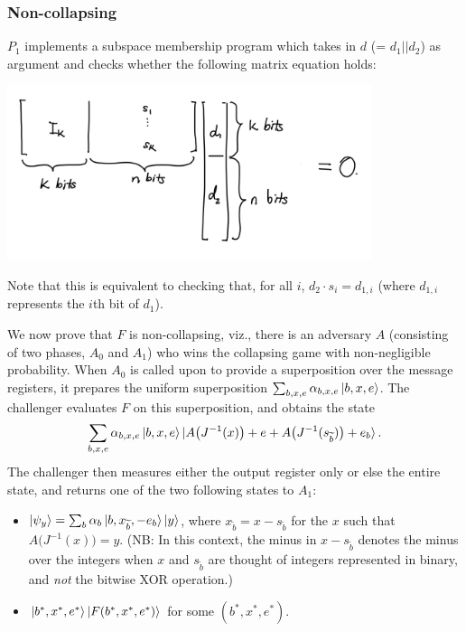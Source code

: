 \documentclass{article}
\begin{document}
\subsubsection{Non-collapsing}
$P_1$ implements a subspace membership program which takes in $d$ (= $d_1 || d_2$) as argument and checks whether the following matrix equation holds:
\begin{center}
\includegraphics[width=0.8\textwidth]{Diagrams/1.png}
\end{center}

Note that this is equivalent to checking that, for all $i$, $d_2 \cdot s_i = d_{1, i}$ (where $d_{1, i}$ represents the $i$th bit of $d_1$).

We now prove that $F$ is non-collapsing, viz., there is an adversary $A$ (consisting of two phases, $A_0$ and $A_1$) who wins the collapsing game with non-negligible probability. When $A_0$ is called upon to provide a superposition over the message registers, it prepares the uniform superposition $\sum_{b, x, e} \alpha_{b, x, e} \ket{b, x, e}$. The challenger evaluates $F$ on this superposition, and obtains the state
\begin{align}
    \sum_{b, x, e} \alpha_{b, x, e} \ket{b, x, e} \ket{A\big( J^{-1}(x) \big) + e + A\big( J^{-1}(s_{\widetilde{b}}) \big) + e_b}.
\end{align}
The challenger then measures either the output register only or else the entire state, and returns one of the two following states to $A_1$:

\begin{itemize}
    \item $\ket{\psi_y} = \sum_{b} \alpha_{b} \ket{b, x_{\widetilde{b}}, -e_b} \ket{y}$, where $x_{\widetilde{b}} = x - s_{\widetilde{b}}$ for the $x$ such that $A\big( J^{-1}(x) \big) = y$. (NB: In this context, the minus in $x - s_{\widetilde{b}}$ denotes the minus over the integers when $x$ and $s_{\widetilde{b}}$ are thought of integers represented in binary, and \textit{not} the bitwise XOR operation.)
    \item $\ket{b^*, x^*, e^*} \ket{F(b^*, x^*, e^*)}$ for some $(b^*, x^*, e^*)$.
\end{itemize}
\end{document}
